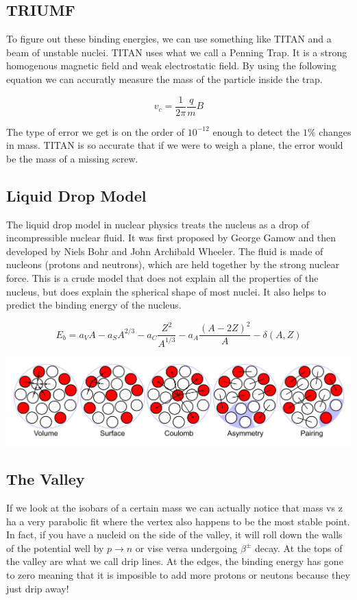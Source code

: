 \documentclass[english, 11pt]{article}
\begin{document}
      \subsection{TRIUMF}

      To figure out these binding energies, we can use something like TITAN and a beam of unstable nuclei. TITAN uses what we call a Penning Trap. It is a strong homogenous magnetic field and weak electrostatic field. By using the following equation we can accuratly measure the mass of the particle inside the trap.

      \[ v_c = \frac{1}{2\pi}\frac{q}{m}B\]

      The type of error we get is on the order of $10^{-12}$ enough to detect the $1\%$ changes in mass. TITAN is so accurate that if we were to weigh a plane, the error would be the mass of a missing screw.

      \subsection{Liquid Drop Model}
      The liquid drop model in nuclear physics treats the nucleus as a drop of incompressible nuclear fluid. It was first proposed by George Gamow and then developed by Niels Bohr and John Archibald Wheeler. The fluid is made of nucleons (protons and neutrons), which are held together by the strong nuclear force. This is a crude model that does not explain all the properties of the nucleus, but does explain the spherical shape of most nuclei. It also helps to predict the binding energy of the nucleus.

      \begin{defn}\label{ldm}
      \[ E_b = a_V A-a_S A^{2/3} - a_C \frac{Z^2}{A^{1/3}} - a_A \frac{(A-2Z)^2}{A} - \delta(A,Z) \]
      \end{defn}

      \begin{center}\label{rus}
         \includegraphics[scale=0.23]{../img/liquid}
      \end{center}

      \subsection{The Valley}
      If we look at the isobars of a certain mass we can actually notice that mass vs z ha a very parabolic fit where the vertex also happens to be the most stable point. In fact, if you have a nucleid on the side of the valley, it will roll down the walls of the potential well by $p \rightarrow n$ or vise versa undergoing $\beta^{\pm}$ decay. At the tops of the valley are what we call drip lines. At the edges, the binding energy has gone to zero meaning that it is imposible to add more protons or neutons because they just drip away!
\end{document}
